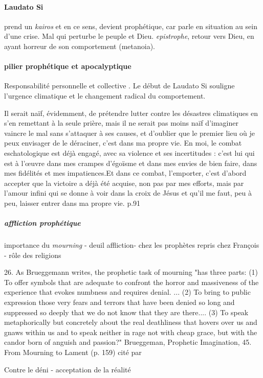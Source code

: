 \paragraph{Laudato Si} prend un \textit{kairos} et en ce sens, devient prophétique, car parle en situation au sein d'une crise. Mal qui perturbe le peuple et Dieu. \textit{epistrophe}, retour vers Dieu, en ayant horreur de son comportement (metanoia). 

\paragraph{pilier prophétique et apocalyptique} Responsabilité personnelle et collective . Le début de Laudato Si
souligne l'urgence climatique et le changement radical du comportement. 
\begin{singlequote}
    Il serait naïf, évidemment, de prétendre lutter contre les désastres climatiques en s'en remettant à la seule prière, mais il ne serait pas moins naïf d'imaginer vaincre le mal sans s'attaquer à ses causes, et d'oublier que le premier lieu où je peux envisager de le déraciner, c'est dans ma propre vie.
En moi, le combat eschatologique est déjà engagé, avec sa violence et ses incertitudes :
c'est lui qui est à l'œuvre dans mes crampes d’égoïsme et dans mes envies de bien faire, dans mes fidélités et mes impatiences.Et dans ce combat, l'emporter, c'est d'abord accepter que la victoire a déjà été acquise, non pas par mes efforts, mais par l'amour infini qui se donne à voir dans la croix de Jésus et qu'il me faut, peu à peu, laisser entrer dans ma propre vie. \cite{candiard_quelques_2022} p.91
\end{singlequote}

\subparagraph{affliction prophétique} importance du \textit{mourning} - deuil affliction- chez les prophètes repris chez François - rôle des religions
\begin{singlequote}
26. As Brueggemann writes, the prophetic task of mourning "has three parts: (1) To offer symbols that are adequate to confront the horror and massiveness of the experience that evokes numbness and requires denial. ... (2) To bring to public expression those very fears and terrors that have been denied so long and suppressed so deeply that we do not know that they are there.... (3) To speak metaphorically but concretely about the real deathliness that hovers over us and gnaws within us and to speak neither in rage not with cheap grace, but with the candor born of anguish and passion?" Brueggeman, Prophetic Imagination, 45. 
From Mourning to Lament (p. 159) cité par \cite{cavanaugh_between_2018}
\end{singlequote}
Contre le déni - acceptation de la réalité
